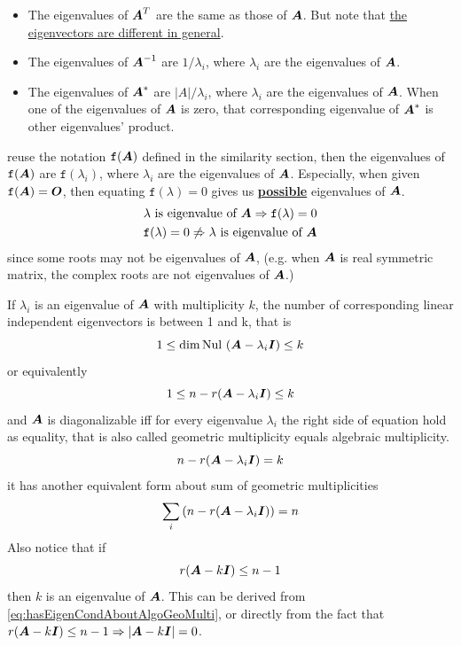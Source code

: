 \documentclass{overview}
\begin{document}
\begin{itemize}
	\item The eigenvalues of $\boldsymbol{A}^{T}$ are the same as those of $\boldsymbol{A}$. But note that 
		\underline{the eigenvectors are different in general}.
	\item The eigenvalues of $\boldsymbol{A}^{-1}$ are $1/\lambda_i$, where $\lambda_i$ are
		the eigenvalues of $\boldsymbol{A}$.
	\item The eigenvalues of $\boldsymbol{A}^{*}$ are $|A|/\lambda_i$, where $\lambda_i$ are
		the eigenvalues of $\boldsymbol{A}$. When one of the eigenvalues of $\boldsymbol{A}$ is zero,
		that corresponding eigenvalue of $\boldsymbol{A}^{*}$ is other eigenvalues' product.
\end{itemize}
reuse the notation $\mathtt{f} (\boldsymbol{A})$ defined in the similarity section, then
the eigenvalues of $\mathtt{f}(\boldsymbol{A})$ are $\mathtt{f} (\lambda_i)$, where $\lambda_i$
are the eigenvalues of $\boldsymbol{A}$. Especially, when given $\mathtt{f} (\boldsymbol{A})=\boldsymbol{O}$,
then equating $\mathtt{f} (\lambda)=0$ gives us \textbf{\underline{possible}} eigenvalues of $\boldsymbol{A}$.
\[
	\begin{aligned}
		\lambda \text{ is eigenvalue of } \boldsymbol{A} \Rightarrow \mathtt{f} (\lambda) = 0 \\
		\mathtt{f} (\lambda) = 0 \not\Rightarrow \lambda \text{ is eigenvalue of } \boldsymbol{A} \\
	\end{aligned}
\] 
since some roots may not be eigenvalues of $\boldsymbol{A}$, (e.g. when $\boldsymbol{A}$ is real
symmetric matrix, the complex roots are not eigenvalues of $\boldsymbol{A}$.)

If $\lambda_i$ is an eigenvalue of $\boldsymbol{A}$ with multiplicity $k$, the number of
corresponding linear independent eigenvectors is between 1 and k, that is
\[
	1\leq \dim\text{Nul}\ (\A-\lambda_i \I) \leq k
\] 
or equivalently
\begin{equation}
1\leq n-r(\boldsymbol{A}-\lambda_i \boldsymbol{I}) \leq k
\label{eq:hasEigenCondAboutAlgoGeoMulti}
\end{equation}
and $\boldsymbol{A}$ is diagonalizable iff for every eigenvalue $\lambda_i$ the right side of
equation hold as equality, that is also called geometric
multiplicity equals algebraic multiplicity.
 \[
	n - r(\boldsymbol{A}-\lambda_i \boldsymbol{I}) = k
\] 
it has another equivalent form about sum of geometric multiplicities
\[
	\sum_{i} \left( n - r(\boldsymbol{A}-\lambda_i \boldsymbol{I}) \right) = n
\] 
Also notice that if
\[
 r(\boldsymbol{A}-k\boldsymbol{I}) \leq n - 1
\] 
then $k$ is an eigenvalue of $\boldsymbol{A}$. This can be derived from \eqref{eq:hasEigenCondAboutAlgoGeoMulti},
or directly from the fact that $r(\boldsymbol{A}-k\boldsymbol{I}) \leq n - 1 \Rightarrow |\boldsymbol{A} - k\boldsymbol{I}| = 0$.
\end{document}
